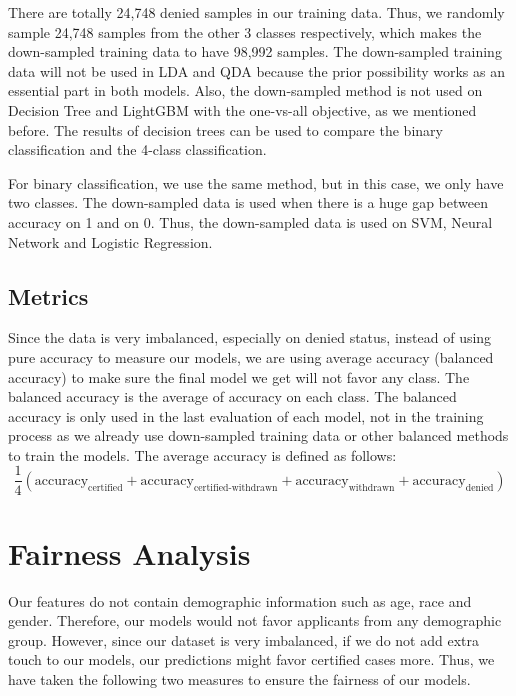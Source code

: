 \documentclass{article}
\begin{document}
There are totally 24,748 denied samples in our training data. Thus, we randomly sample 24,748 samples from the other 3 classes respectively, which makes the down-sampled training data to have 98,992 samples. The down-sampled training data will not be used in LDA and QDA because the prior possibility works as an essential part in both models. Also, the down-sampled method is not used on Decision Tree and LightGBM with the one-vs-all objective, as we mentioned before. The results of decision trees can be used to compare the binary classification and the 4-class classification. 

For binary classification, we use the same method, but in this case, we only have two classes. The down-sampled data is used when there is a huge gap between accuracy on 1 and on 0. Thus, the down-sampled data is used on SVM, Neural Network and Logistic Regression. 

\subsection{Metrics} \label{metrics}
Since the data is very imbalanced, especially on denied status, instead of using pure accuracy to measure our models, we are using average accuracy (balanced accuracy) to make sure the final model we get will not favor any class. The balanced accuracy is the average of accuracy on each class. The balanced accuracy is only used in the last evaluation of each model, not in the training process as we already use down-sampled training data or other balanced methods to train the models. The average accuracy is defined as follows:
\begin{equation} \label{eq:1}
        \frac{1}{4}\left(\text{accuracy}_\text{certified} + \text{accuracy}_\text{certified-withdrawn} + \text{accuracy}_\text{withdrawn} + \text{accuracy}_\text{denied}\right)
\end{equation}
\section{Fairness Analysis}

Our features do not contain demographic information such as age, race and gender. Therefore, our models would not favor applicants from any demographic group. However, since our dataset is very imbalanced, if we do not add extra touch to our models, our predictions might favor certified cases more. Thus, we have taken the following two measures to ensure the fairness of our models.
\end{document}
